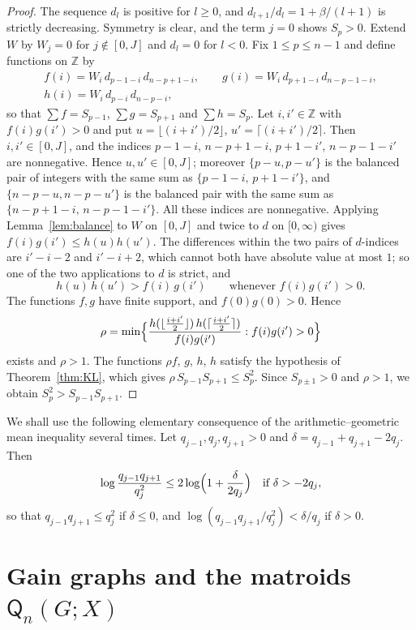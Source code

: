 \documentclass[11pt]{amsart}
\theoremstyle{definition}
\theoremstyle{remark}
\numberwithin{equation}{section}
\newcommand{\Q}{\mathsf{Q}}
\begin{document}
\begin{proof}
The sequence $d_l$ is positive for $l\ge0$, and $d_{l+1}/d_l=1+\beta/(l+1)$ is strictly decreasing. Symmetry is clear, and the term $j=0$ shows $S_p>0$. Extend $W$ by $W_j=0$ for $j\notin[0,J]$ and $d_l=0$ for $l<0$. Fix $1\le p\le n-1$ and define functions on $\mathbb{Z}$ by
\begin{gather*}
f(i)=W_i\,d_{p-1-i}\,d_{n-p+1-i},\qquad g(i)=W_i\,d_{p+1-i}\,d_{n-p-1-i},\\
h(i)=W_i\,d_{p-i}\,d_{n-p-i},
\end{gather*}
so that $\sum f=S_{p-1}$, $\sum g=S_{p+1}$ and $\sum h=S_p$. Let $i,i'\in\mathbb{Z}$ with $f(i)g(i')>0$ and put $u=\lfloor(i+i')/2\rfloor$, $u'=\lceil(i+i')/2\rceil$. Then $i,i'\in[0,J]$, and the indices $p-1-i$, $n-p+1-i$, $p+1-i'$, $n-p-1-i'$ are nonnegative. Hence $u,u'\in[0,J]$; moreover $\{p-u,p-u'\}$ is the balanced pair of integers with the same sum as $\{p-1-i,\,p+1-i'\}$, and $\{n-p-u,n-p-u'\}$ is the balanced pair with the same sum as $\{n-p+1-i,\,n-p-1-i'\}$. All these indices are nonnegative. Applying Lemma~\ref{lem:balance} to $W$ on $[0,J]$ and twice to $d$ on $[0,\infty)$ gives $f(i)g(i')\le h(u)h(u')$. The differences within the two pairs of $d$-indices are $i'-i-2$ and $i'-i+2$, which cannot both have absolute value at most $1$; so one of the two applications to $d$ is strict, and
\[
h(u)\,h(u')>f(i)\,g(i')\qquad\text{whenever }f(i)g(i')>0.
\]
The functions $f,g$ have finite support, and $f(0)g(0)>0$. Hence
\[
\rho=\min\Bigl\{\frac{h(\lfloor\frac{i+i'}2\rfloor)\,h(\lceil\frac{i+i'}2\rceil)}{f(i)g(i')}:f(i)g(i')>0\Bigr\}
\]
exists and $\rho>1$. The functions $\rho f$, $g$, $h$, $h$ satisfy the hypothesis of Theorem~\ref{thm:KL}, which gives $\rho\,S_{p-1}S_{p+1}\le S_p^2$. Since $S_{p\pm1}>0$ and $\rho>1$, we obtain $S_p^2>S_{p-1}S_{p+1}$.
\end{proof}

We shall use the following elementary consequence of the arithmetic--geometric mean inequality several times. Let $q_{j-1},q_j,q_{j+1}>0$ and $\delta=q_{j-1}+q_{j+1}-2q_j$. Then
\begin{equation}\label{eq:amgm}
\log\frac{q_{j-1}q_{j+1}}{q_j^2}\le2\log\Bigl(1+\frac{\delta}{2q_j}\Bigr)\quad\text{if }\delta>-2q_j,
\end{equation}
so that $q_{j-1}q_{j+1}\le q_j^2$ if $\delta\le0$, and $\log(q_{j-1}q_{j+1}/q_j^2)<\delta/q_j$ if $\delta>0$.

\section{Gain graphs and the matroids \texorpdfstring{$\Q_n(G;X)$}{Qn(G;X)}}\label{sec:gain}
\end{document}
